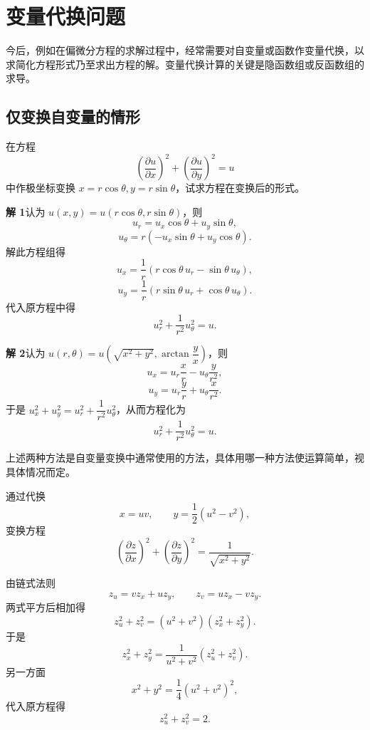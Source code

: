 \section{变量代换问题}

今后，例如在偏微分方程的求解过程中，经常需要对自变量或函数作变量代换，以求简化方程形式乃至求出方程的解。变量代换计算的关键是隐函数组或反函数组的求导。

\subsection{仅变换自变量的情形}

\begin{xexample}[20.3.1]
在方程
\[
  \left(\frac{\partial u}{\partial x}\right)^2+
  \left(\frac{\partial u}{\partial y}\right)^2=u
\]
中作极坐标变换 $x=r\cos\theta,y=r\sin\theta$，试求方程在变换后的形式。
\end{xexample}
\begin{xsolution}
\textbf{解 1}\quad 认为 $u(x,y)=u(r\cos\theta,r\sin\theta)$，则
\[
  u_r=u_x\cos\theta+u_y\sin\theta,
\]
\[
  u_\theta=r(-u_x\sin\theta+u_y\cos\theta).
\]
解此方程组得
\[
  u_x=\frac1r(r\cos\theta\,u_r-\sin\theta\,u_\theta),
\]
\[
  u_y=\frac1r(r\sin\theta\,u_r+\cos\theta\,u_\theta).
\]
代入原方程中得
\[
  u_r^2+\frac1{r^2}u_\theta^2=u.
\]

\textbf{解 2}\quad 认为 $u(r,\theta)=u\left(\sqrt{x^2+y^2},\arctan\dfrac yx\right)$，则
\[
  u_x=u_r\frac xr-u_\theta\frac y{r^2},
\]
\[
  u_y=u_r\frac yr+u_\theta\frac x{r^2}.
\]
于是 $u_x^2+u_y^2=u_r^2+\dfrac1{r^2}u_\theta^2$，从而方程化为
\[
  u_r^2+\frac1{r^2}u_\theta^2=u.
\]
\end{xsolution}

\begin{xremark}
上述两种方法是自变量变换中通常使用的方法，具体用哪一种方法使运算简单，视具体情况而定。
\end{xremark}

\begin{xexample}[20.3.2]
通过代换
\[
  x=uv,\qquad y=\frac12(u^2-v^2),
\]
变换方程
\[
  \left(\frac{\partial z}{\partial x}\right)^2+
  \left(\frac{\partial z}{\partial y}\right)^2
  =\frac1{\sqrt{x^2+y^2}}.
\]
\end{xexample}
\begin{xsolution}
由链式法则
\[
  z_u=vz_x+uz_y,\qquad z_v=uz_x-vz_y.
\]
两式平方后相加得
\[
  z_u^2+z_v^2=(u^2+v^2)(z_x^2+z_y^2).
\]
于是
\[
  z_x^2+z_y^2=\frac1{u^2+v^2}(z_u^2+z_v^2).
\]
另一方面
\[
  x^2+y^2=\frac14(u^2+v^2)^2,
\]
代入原方程得
\[
  z_u^2+z_v^2=2.
\]
\end{xsolution}

